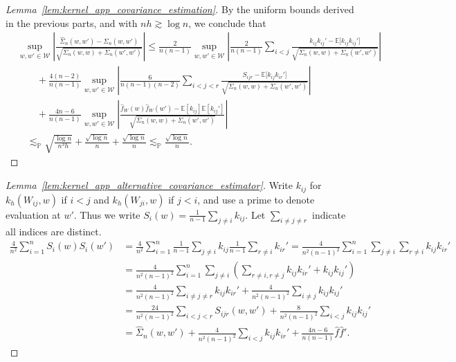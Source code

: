 \documentclass[11pt,lof]{puthesis}
\renewcommand{\P}{\ensuremath{\mathbb{P}}}
\newcommand{\E}{\ensuremath{\mathbb{E}}}
\newcommand{\cW}{\ensuremath{\mathcal{W}}}
\theoremstyle{break}
\theoremstyle{proof}
\newtheorem{proof}{Proof}
\begin{document}
\begin{proof}[Lemma~\ref{lem:kernel_app_covariance_estimation}]
  By the uniform bounds derived in the previous parts,
  and with $n h \gtrsim \log n$, we conclude that
  \begin{align*}
    &\sup_{w,w' \in \cW}
    \left|
      \frac{\hat \Sigma_n(w,w') - \Sigma_n(w,w')}
      {\sqrt{\Sigma_n(w,w) + \Sigma_n(w',w')}}
    \right|
    \leq
    \frac{2}{n(n-1)}
    \sup_{w,w' \in \cW}
    \left|
      \frac{2}{n(n-1)}
      \!\sum_{i<j}\!
      \frac{k_{i j} k_{i j}' - \E\big[k_{i j} k_{i j}']}
      {\sqrt{\Sigma_n(w,w) + \Sigma_n(w',w')}}
    \right| \\
    &\qquad+
    \frac{4(n-2)}{n(n-1)}
    \sup_{w,w' \in \cW}
    \left|
      \frac{6}{n(n-1)(n-2)}
      \sum_{i<j<r}
      \frac{S_{i j r} - \E\big[k_{i j} k_{i r}']}
      {\sqrt{\Sigma_n(w,w) + \Sigma_n(w',w')}}
    \right| \\
    &\qquad+
    \frac{4n-6}{n(n-1)}
    \sup_{w,w' \in \cW}
    \left|
      \frac{\hat f_W(w) \hat f_W(w') - \E[k_{i j}] \E[k_{i j}']}
      {\sqrt{\Sigma_n(w,w) + \Sigma_n(w',w')}}
    \right| \\
    &\quad\lesssim_\P
    \sqrt{\frac{\log n}{n^3h}}
    + \frac{\sqrt{\log n}}{n}
    + \frac{\sqrt{\log n}}{n}
    \lesssim_\P
    \frac{\sqrt{\log n}}{n}.
  \end{align*}
\end{proof}

\begin{proof}[Lemma~\ref{lem:kernel_app_alternative_covariance_estimator}]

  Write $k_{i j}$ for $k_h(W_{i j},w)$
  if $i<j$ and $k_h(W_{j i},w)$ if $j<i$,
  and use a prime to denote evaluation at $w'$.
  Thus we write $S_i(w) = \frac{1}{n-1} \sum_{j \neq i} k_{i j}$.
  Let $\sum_{i \neq j \neq r}$ indicate all indices are distinct.
  \begin{align*}
    \frac{4}{n^2}
    \sum_{i=1}^n
    S_i(w) S_i(w')
    &=
    \frac{4}{n^2}
    \sum_{i=1}^n
    \frac{1}{n-1}
    \sum_{j \neq i}
    k_{i j}
    \frac{1}{n-1}
    \sum_{r \neq i}
    k_{i r}'
    =
    \frac{4}{n^2(n-1)^2}
    \sum_{i=1}^n
    \sum_{j \neq i}
    \sum_{r \neq i}
    k_{i j}
    k_{i r}' \\
    &=
    \frac{4}{n^2(n-1)^2}
    \sum_{i=1}^n
    \sum_{j \neq i}
    \left(
      \sum_{r \neq i, r \neq j}
      k_{i j}
      k_{i r}'
      + k_{i j}
      k_{i j}'
    \right) \\
    &=
    \frac{4}{n^2(n-1)^2}
    \sum_{i \neq j \neq r}
    k_{i j}
    k_{i r}'
    + \frac{4}{n^2(n-1)^2}
    \sum_{i \neq j}
    k_{i j}
    k_{i j}' \\
    &=
    \frac{24}{n^2(n-1)^2}
    \sum_{i < j < r}
    S_{i j r}(w,w')
    + \frac{8}{n^2(n-1)^2}
    \sum_{i < j}
    k_{i j}
    k_{i j}' \\
    &=
    \hat \Sigma_n(w,w')
    + \frac{4}{n^2(n-1)^2}
    \sum_{i < j}
    k_{i j}
    k_{i r}'
    + \frac{4n-6}{n(n-1)}
    \hat f
    \hat f'.
  \end{align*}
\end{proof}
\end{document}
